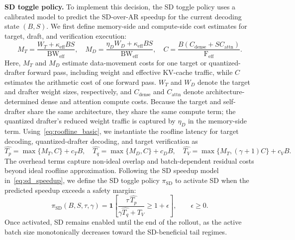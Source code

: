 \documentclass{llmxive}
\providecommand{\DrafterDist}{q}
\providecommand{\TargetDist}{p}
\providecommand{\DraftLength}{\gamma}
\providecommand{\TargetTime}{T_\TargetDist}
\providecommand{\DraftTime}{T_\DrafterDist}
\providecommand{\VerifyTime}{T_V}
\providecommand{\mal}{\tau}
\providecommand{\EffBandwidth}{\mathrm{BW}_{\mathrm{eff}}}
\providecommand{\ToggleMargin}{\epsilon}
\providecommand{\TargetMemory}{M_T}
\providecommand{\DrafterMemory}{M_D}
\providecommand{\ForwardCompute}{C}
\providecommand{\TargetWeights}{W_T}
\providecommand{\DrafterWeights}{W_D}
\providecommand{\KVTrafficCoeff}{\kappa_{\mathrm{eff}}}
\providecommand{\DrafterQuantCoeff}{\eta_D}
\providecommand{\TargetOverhead}{c_T}
\providecommand{\DrafterOverhead}{c_D}
\providecommand{\VerifyOverhead}{c_V}
\providecommand{\DenseCompute}{C_{\mathrm{dense}}}
\providecommand{\AttnCompute}{C_{\mathrm{attn}}}
\providecommand{\SDToggle}{\pi_{\mathrm{SD}}}
\begin{document}
\textbf{SD toggle policy.} 
To implement this decision, the SD toggle policy uses a calibrated model to predict the SD-over-AR speedup for the current decoding state $(B,S)$.
We first define memory-side and compute-side cost estimates for target, draft, and verification execution:
\begin{equation*}
\TargetMemory
=
\frac{\TargetWeights+\KVTrafficCoeff BS}{\EffBandwidth},
\quad
\DrafterMemory
=
\frac{\DrafterQuantCoeff\DrafterWeights+\KVTrafficCoeff BS}{\EffBandwidth},
\quad
\ForwardCompute
=
\frac{B(\DenseCompute+S\AttnCompute)}{\mathrm{F}_{\mathrm{eff}}}.
\end{equation*}
Here, $\TargetMemory$ and $\DrafterMemory$ estimate data-movement costs for one target or quantized-drafter forward pass, including weight and effective KV-cache traffic, while $\ForwardCompute$ estimates the arithmetic cost of one forward pass.
$\TargetWeights$ and $\DrafterWeights$ denote the target and drafter weight sizes, respectively, and $\DenseCompute$ and $\AttnCompute$ denote architecture-determined dense and attention compute costs.
Because the target and self-drafter share the same architecture, they share the same compute term; the quantized drafter's reduced weight traffic is captured by $\DrafterQuantCoeff$ in the memory-side term.
Using~\cref{eq:roofline_basic}, we instantiate the roofline latency for target decoding, quantized-drafter decoding, and target verification as
\begin{equation*}
\widehat{\TargetTime}
=
\max\{\TargetMemory,\ForwardCompute\}
+
\TargetOverhead B,
\quad
\widehat{\DraftTime}
=
\max\{\DrafterMemory,\ForwardCompute\}
+
\DrafterOverhead B,
\quad
\widehat{\VerifyTime}
=
\max\{\TargetMemory,(\DraftLength+1)\ForwardCompute\}
+
\VerifyOverhead B.
\label{eq:toggle_latencies}
\end{equation*}
The overhead terms capture non-ideal overlap and batch-dependent residual costs beyond ideal roofline approximation.
Following the SD speedup model in~\cref{eq:sd_speedup}, we define the SD toggle policy $\SDToggle$ to activate SD when the predicted speedup exceeds a safety margin:
\begin{equation}
\SDToggle(B,S,\mal,\DraftLength)
=
\mathbf{1}
\left[
\frac{
\mal\,\widehat{\TargetTime}
}{
\DraftLength\widehat{\DraftTime}
+
\widehat{\VerifyTime}
}
\geq
1+\ToggleMargin
\right],
\qquad
\ToggleMargin\geq0.
\label{eq:sd_speedup_toggle}
\end{equation}
Once activated, SD remains enabled until the end of the rollout, as the active batch size monotonically decreases toward the SD-beneficial tail regimes.
\end{document}
